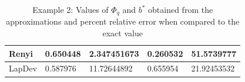 \begin{table}[]
\begin{tabular}{|l|l|l|l|l|}
Renyi  & 0.650448                                                              & 2.347451673                                                                 & 0.260532                                                     & 51.5739777                                                              \\ \hline
LapDev & 0.587976                                                              & 11.72644892                                                                 & 0.655954                                                     & 21.92453532                                                             \\ \hline
\end{tabular}
\caption{Example 2: Values of $\Phi_q$ and $b^*$ obtained from the approximations and percent relative error when compared to the exact value}
\label{table:sample2}
\end{table}

